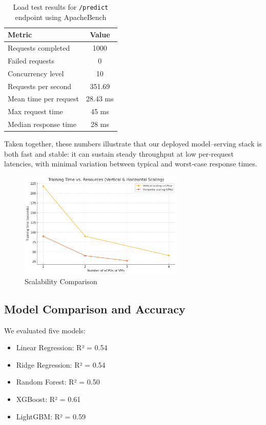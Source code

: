 \documentclass[12pt,a4paper]{article}
\begin{document}
\begin{table}[H]
\centering
\caption{Load test results for \texttt{/predict} endpoint using ApacheBench}
\begin{tabular}{|l|c|}
\hline
\textbf{Metric} & \textbf{Value} \\
\hline
Requests completed         & 1000 \\
Failed requests            & 0 \\
Concurrency level          & 10 \\
Requests per second        & 351.69 \\
Mean time per request      & 28.43 ms \\
Max request time           & 45 ms \\
Median response time       & 28 ms \\
\hline
\end{tabular}
\label{tab:predict-benchmark}
\end{table}

Taken together, these numbers illustrate that our deployed model–serving stack is both fast and stable: it can sustain steady throughput at low per‐request latencies, with minimal variation between typical and worst‐case response times.

\begin{figure}[H]
  \centering
  \includegraphics[width=0.7\textwidth]{Comparison.png}
  \caption{Scalability Comparison}
  \label{fig:my-image}
\end{figure}

\subsection{Model Comparison and Accuracy}
We evaluated five models:
\begin{itemize}[noitemsep]
    \item Linear Regression: R² = 0.54
    \item Ridge Regression: R² = 0.54
    \item Random Forest: R² = 0.50
    \item XGBoost: R² = 0.61
    \item LightGBM: R² = 0.59
\end{itemize}
\end{document}
